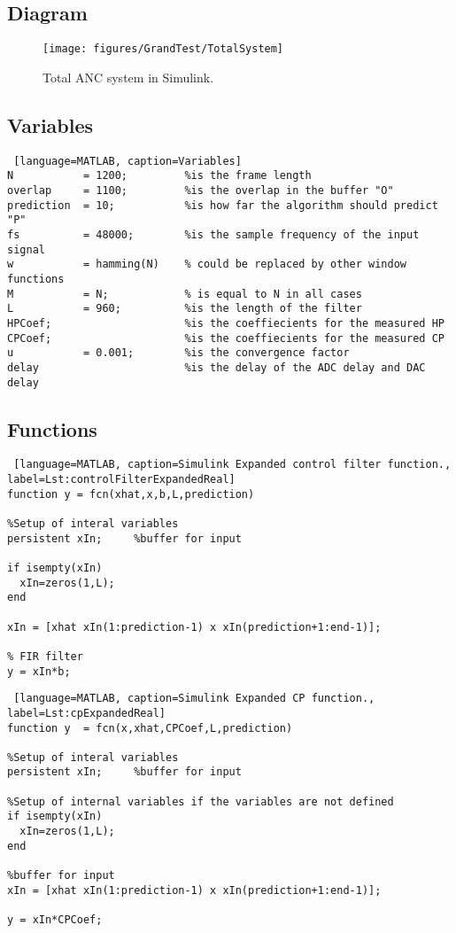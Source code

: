 \subsection{Diagram}
\begin{figure}[H]
	\centering
	\texttt{[image: figures/GrandTest/TotalSystem]}
	\caption{Total ANC system in Simulink.}
	\label{fig:SimulinktotalSystem}
\end{figure}


\subsection{Variables}
\begin{lstlisting} [language=MATLAB, caption=Variables]
N 			= 1200; 		%is the frame length 
overlap 	= 1100;			%is the overlap in the buffer "O"
prediction 	= 10; 			%is how far the algorithm should predict "P"
fs 			= 48000; 		%is the sample frequency of the input signal 
w           = hamming(N)	% could be replaced by other window functions
M           = N;			% is equal to N in all cases
L  			= 960;  	 	%is the length of the filter
HPCoef;  		 			%is the coeffiecients for the measured HP
CPCoef;  		 			%is the coeffiecients for the measured CP
u  			= 0.001;		%is the convergence factor
delay 			 			%is the delay of the ADC delay and DAC delay
\end{lstlisting}

\subsection{Functions}

\begin{lstlisting} [language=MATLAB, caption=Simulink Expanded control filter function., label=Lst:controlFilterExpandedReal]
function y = fcn(xhat,x,b,L,prediction)

%Setup of interal variables
persistent xIn;     %buffer for input

if isempty(xIn)
  xIn=zeros(1,L);
end

xIn = [xhat xIn(1:prediction-1) x xIn(prediction+1:end-1)];

% FIR filter
y = xIn*b;
\end{lstlisting}

\begin{lstlisting} [language=MATLAB, caption=Simulink Expanded CP function., label=Lst:cpExpandedReal]
function y  = fcn(x,xhat,CPCoef,L,prediction)

%Setup of interal variables
persistent xIn;     %buffer for input

%Setup of internal variables if the variables are not defined
if isempty(xIn)
  xIn=zeros(1,L);
end

%buffer for input
xIn = [xhat xIn(1:prediction-1) x xIn(prediction+1:end-1)];

y = xIn*CPCoef;
\end{lstlisting}

